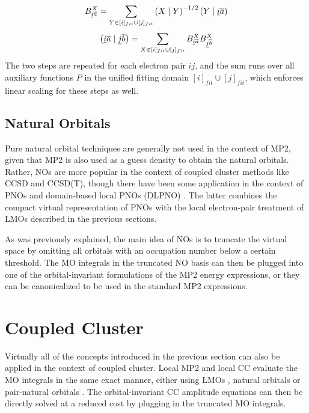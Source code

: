 \begin{equation}
B^{X}_{\underline{i}\overline{a}} = \sum_{Y \in [i]_{fit} \cup [j]_{fit}} \left( X \mid Y \right)^{-1/2} \left( Y \mid \underline{i}\overline{a} \right)
\end{equation}
\begin{equation}
\left( \underline{i}\overline{a} \mid \underline{j}\overline{b} \right) = \sum_{X \in [i]_{fit} \cup [j]_{fit}} B^{X}_{\underline{i}\overline{a}} B^{X}_{\underline{j}\overline{b}} 
\end{equation}
\noindent The two steps are repeated for each electron pair $ij$, and the sum runs over all auxiliary functions $P$ in the unified fitting domain $[i]_{fit} \cup [j]_{fit}$, which enforces linear scaling for these steps as well. 


\subsection{Natural Orbitals}

Pure natural orbital techniques are generally not used in the context of MP2, given that MP2 is also used as a guess density to obtain the natural orbitals. Rather, NOs are more popular in the context of coupled cluster methods like CCSD and CCSD(T), though there have been some application in the context of PNOs \cite{Fra2017,Sch2013} and domain-based local PNOs (DLPNO) \cite{Wer2015,Pin2018}. The latter combines the compact virtual representation of PNOs with the local electron-pair treatment of LMOs   described in the previous sections. 

As was previously explained, the main idea of NOs is to truncate the virtual space by omitting all orbitals with an occupation number below a certain threshold. The MO integrals in the truncated NO basis can then be plugged into one of the orbital-invariant formulations of the MP2 energy expressions, or they can be canonicalized to be used in the standard MP2 expressions.

\section{Coupled Cluster}

Virtually all of the concepts introduced in the previous section can also be applied in the context of coupled cluster. Local MP2 and local CC evaluate the MO integrals in the same exact manner, either using LMOs \cite{Sch2001, Sch2002, Sch2000a, Sch2000b,Sch2001}, natural orbitals \cite{Tau2008,Nag2018,Rol2013} or pair-natural orbitals \cite{Nee2009a,Guo2018,Sch2017,Rip2013}. The orbital-invariant CC amplitude equations can then be directly solved at a reduced cost by plugging in the truncated MO integrals.

